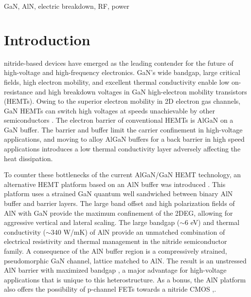 \documentclass[journal]{IEEEtran}
\begin{document}
\begin{IEEEkeywords}
  GaN, AlN, electric breakdown, RF, power
\end{IEEEkeywords}

%
\IEEEpeerreviewmaketitle
\section{Introduction}
 nitride-based devices have emerged as the leading contender for the future of high-voltage and high-frequency electronics. GaN's wide bandgap, large critical fields, high electron mobility, and excellent thermal conductivity enable low on-resistance and high breakdown voltages in GaN high-electron mobility transistors (HEMTs). Owing to the superior electron mobility in 2D electron gas channels, GaN HEMTs can switch high voltages at speeds unachievable by other semiconductors \cite{Danilovic2011}. The electron barrier of conventional HEMTs is AlGaN on a GaN buffer. The barrier and buffer limit the carrier confinement in high-voltage applications, and moving to alloy AlGaN buffers for a back barrier in high speed applications \cite{Shinohara2010, Shinohara2011, Lee2011} introduces a low thermal conductivity layer adversely affecting the heat dissipation.

To counter these bottlenecks of the current AlGaN/GaN HEMT technology, an alternative HEMT platform based on an AlN buffer was introduced \cite{Wang2012}. This platform uses a strained GaN quantum well sandwiched between binary AlN buffer and barrier layers. The large band offset and high polarization fields of AlN with GaN provide the maximum confinement of the 2DEG, allowing for aggressive vertical and lateral scaling. The large bandgap ($\sim$6 eV) and thermal conductivity ($\sim$340 W/mK) \cite{Rounds2018} of AlN provide an unmatched combination of electrical resistivity and thermal management in the nitride semiconductor family. A consequence of the AlN buffer region is a compressively strained, pseudomorphic GaN channel, lattice matched to AlN. The result is an unstressed AlN barrier with maximized bandgap \textcolor{black}{\cite{Li2014}}, a major advantage for high-voltage applications that is unique to this heterostructure. As a bonus, the AlN platform also offers the possibility of p-channel FETs towards a nitride CMOS \cite{Li2013},\cite{Bader2018}.
\end{document}
